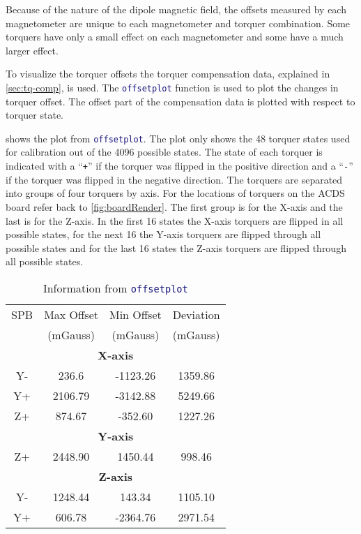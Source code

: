 Because of the nature of the dipole magnetic field, the offsets measured by each magnetometer are unique to each magnetometer and torquer combination. Some torquers have only a small effect on each magnetometer and some have a much larger effect. 

To visualize the torquer offsets the torquer compensation data, explained in \cref{sec:tq-comp}, is used. The \lstinline[style=code,language=Matlab]$offsetplot$ function is used to plot the changes in torquer offset. The offset part of the compensation data is plotted with respect to torquer state.

 shows the plot from \lstinline[style=code,language=Matlab]$offsetplot$. The plot only shows the 48 torquer states used for calibration out of the 4096 possible states. The state of each torquer is indicated with a ``\texttt{+}'' if the torquer was flipped in the positive direction and a ``\texttt{-}'' if the torquer was flipped in the negative direction. The torquers are separated into groups of four torquers by axis. For the locations of torquers on the \ac{ACDS} board refer back to \cref{fig:boardRender}. The first group is for the X-axis and the last is for the Z-axis. In the first 16 states the X-axis torquers are flipped in all possible states, for the next 16 the Y-axis torquers are flipped through all possible states and for the last 16 states the Z-axis torquers are flipped through all possible states.

 
\begin{table}[!ht]
    \centering
    \caption{Information from \lstinline[style=code,language=Matlab]$offsetplot$}
    \label{tab:off-stat}
    \begin{tabular}{|c|c|c|c|}
        \hline
        \acs{SPB}&Max Offset&Min Offset&Deviation\\
        &(mGauss)&(mGauss)&(mGauss)\\
        \hline
        \multicolumn{4}{|c|}{\bfseries X-axis}\\
        \hline
        Y-&236.6&-1123.26&1359.86\\
        \hline
        Y+&2106.79&-3142.88&5249.66\\
        \hline
        Z+&874.67&-352.60&1227.26\\
        \hline
        \multicolumn{4}{|c|}{\bfseries Y-axis}\\
        \hline
        Z+&2448.90&1450.44&998.46\\
        \hline
        \multicolumn{4}{|c|}{\bfseries Z-axis}\\
        \hline
        Y-&1248.44&143.34&1105.10\\
        \hline
        Y+&606.78&-2364.76&2971.54\\
        \hline
    \end{tabular}
\end{table}

